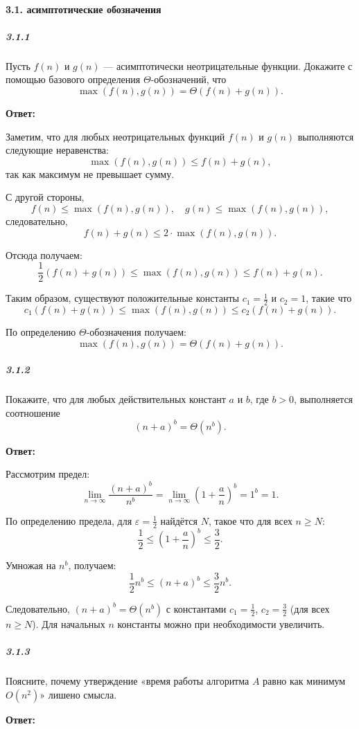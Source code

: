 \paragraph{3.1. асимптотические обозначения}
\subparagraph{3.1.1}

Пусть $f(n)$ и $g(n)$ — асимптотически неотрицательные функции. Докажите с помощью базового определения $\Theta$-обозначений, что
\[
\max(f(n), g(n)) = \Theta(f(n) + g(n)).
\]

\textbf{Ответ:}

Заметим, что для любых неотрицательных функций $f(n)$ и $g(n)$ выполняются следующие неравенства:
\[
\max(f(n), g(n)) \leq f(n) + g(n),
\]
так как максимум не превышает сумму.

С другой стороны,
\[
f(n) \leq \max(f(n), g(n)), \quad g(n) \leq \max(f(n), g(n)),
\]
следовательно,
\[
f(n) + g(n) \leq 2 \cdot \max(f(n), g(n)).
\]

Отсюда получаем:
\[
\frac{1}{2}(f(n) + g(n)) \leq \max(f(n), g(n)) \leq f(n) + g(n).
\]

Таким образом, существуют положительные константы $c_1 = \frac{1}{2}$ и $c_2 = 1$, такие что
\[
c_1 (f(n) + g(n)) \leq \max(f(n), g(n)) \leq c_2 (f(n) + g(n)).
\]

По определению $\Theta$-обозначения получаем:
\[
\max(f(n), g(n)) = \Theta(f(n) + g(n)).
\]

\subparagraph{3.1.2}
Покажите, что для любых действительных констант $a$ и $b$, где $b > 0$, выполняется соотношение
\[
(n + a)^b = \Theta(n^b).
\]

\textbf{Ответ:}

Рассмотрим предел:
\[
\lim_{n \to \infty} \frac{(n + a)^b}{n^b} = \lim_{n \to \infty} \left(1 + \frac{a}{n}\right)^b = 1^b = 1.
\]

По определению предела, для $\varepsilon = \frac{1}{2}$ найдётся $N$, такое что для всех $n \ge N$:
\[
\frac{1}{2} \le \left(1 + \frac{a}{n}\right)^b \le \frac{3}{2}.
\]

Умножая на $n^b$, получаем:
\[
\frac{1}{2} n^b \le (n + a)^b \le \frac{3}{2} n^b.
\]

Следовательно, $(n + a)^b = \Theta(n^b)$ с константами $c_1 = \frac{1}{2}$, $c_2 = \frac{3}{2}$ (для всех $n \ge N$).
Для начальных $n$ константы можно при необходимости увеличить.


\subparagraph{3.1.3}
Поясните, почему утверждение «время работы алгоритма $A$ равно как минимум $O(n^2)$» лишено смысла.

\textbf{Ответ:}

